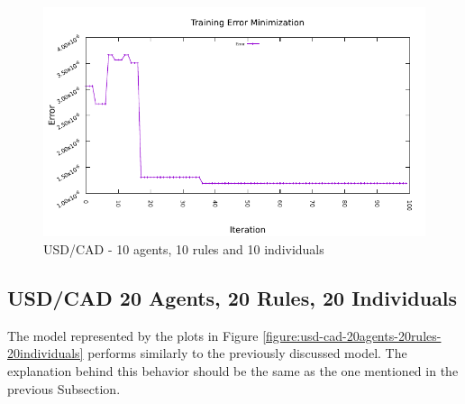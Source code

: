\begin{figure}[htp]
  \medskip

  \includegraphics[width=.45\textwidth]{img/plots/usd_cad_h1-10agents-10rules-10ind-100gen_error_minimization.pdf}

  \caption{USD/CAD - 10 agents, 10 rules and 10 individuals}
  \label{figure:usd-cad-10agents-10rules-10individuals}
\end{figure}

\newpage

\subsection{USD/CAD 20 Agents, 20 Rules, 20 Individuals}
\label{results:forecast-usd-cad-20agents-20rules-20individuals}

The model represented by the plots in Figure
\ref{figure:usd-cad-20agents-20rules-20individuals} performs similarly to the
previously discussed model. The explanation behind this behavior should be the
same as the one mentioned in the previous Subsection.

